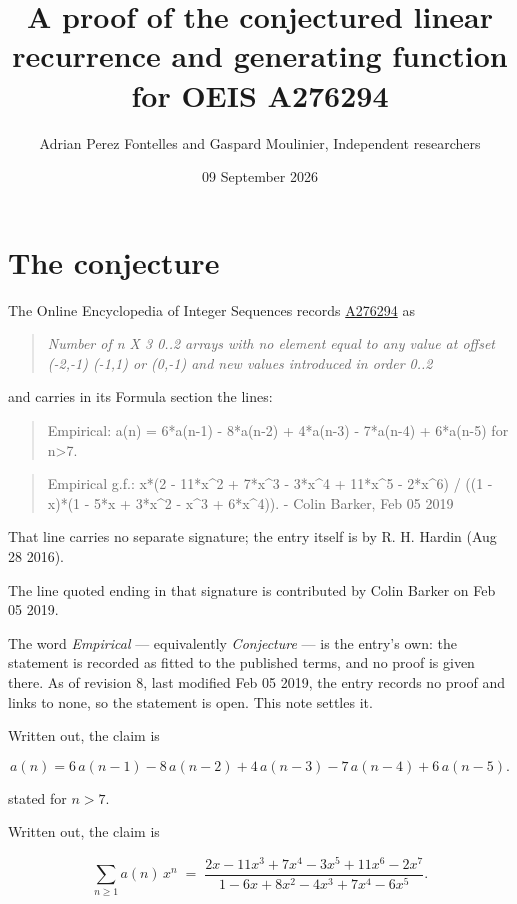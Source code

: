 \documentclass[11pt]{article}
\title{A proof of the conjectured linear recurrence and generating function for OEIS A276294}
\author{Adrian Perez Fontelles and Gaspard Moulinier, Independent researchers}
\date{09 September 2026}
\theoremstyle{definition}
\begin{document}
\maketitle
\section{The conjecture}

The Online Encyclopedia of Integer Sequences records \href{https://oeis.org/A276294}{A276294} as

\begin{quote}\itshape Number of n X 3 0..2 arrays with no element equal to any value at offset (-2,-1) (-1,1) or (0,-1) and new values introduced in order 0..2\end{quote}

and carries in its Formula section the lines:

\begin{quote}\ttfamily Empirical: a(n) = 6*a(n-1) - 8*a(n-2) + 4*a(n-3) - 7*a(n-4) + 6*a(n-5) for n>7.\end{quote}

\begin{quote}\ttfamily Empirical g.f.: x*(2 - 11*x\textasciicircum{}2 + 7*x\textasciicircum{}3 - 3*x\textasciicircum{}4 + 11*x\textasciicircum{}5 - 2*x\textasciicircum{}6) / ((1 - x)*(1 - 5*x + 3*x\textasciicircum{}2 - x\textasciicircum{}3 + 6*x\textasciicircum{}4)). - Colin Barker, Feb 05 2019\end{quote}

That line carries no separate signature; the entry itself is by R. H. Hardin (Aug 28 2016).

The line quoted ending in that signature is contributed by Colin Barker on Feb 05 2019.

The word {\itshape Empirical} --- equivalently {\itshape Conjecture} --- is the entry's own: the statement is recorded as fitted to the published terms, and no proof is given there. As of revision 8, last modified Feb 05 2019, the entry records no proof and links to none, so the statement is open. This note settles it.

Written out, the claim is

\[a(n) = 6\,a(n-1) - 8\,a(n-2) + 4\,a(n-3) - 7\,a(n-4) + 6\,a(n-5).\]

stated for $n > 7$.

Written out, the claim is

\[\sum_{n \ge 1} a(n)\,x^n \;=\; \frac{2x - 11x^{3} + 7x^{4} - 3x^{5} + 11x^{6} - 2x^{7}}{1 - 6x + 8x^{2} - 4x^{3} + 7x^{4} - 6x^{5}}.\]
\end{document}
